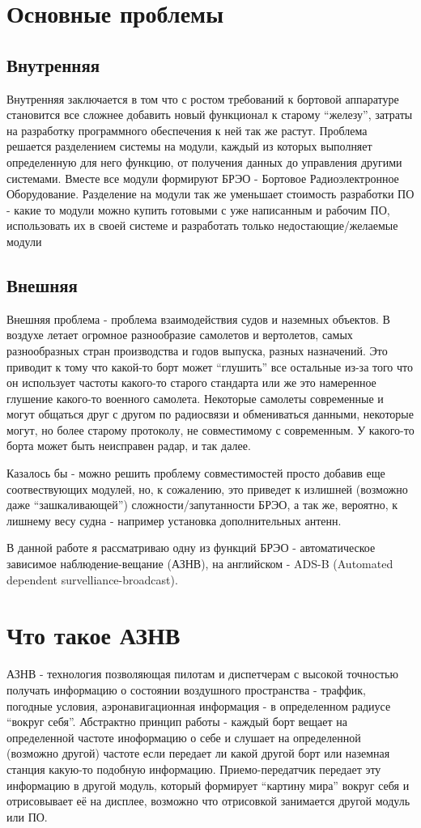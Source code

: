 \documentclass[a4paper,12pt]{report} %
\begin{document}
\section{Основные проблемы}

\subsection{Внутренняя}
Внутренняя заключается в том что с ростом требований к бортовой аппаратуре
становится все сложнее добавить новый функционал к старому ``железу'', затраты
на разработку программного обеспечения к ней так же растут. Проблема решается
разделением системы на модули, каждый из которых выполняет определенную для него
функцию, от получения данных до управления другими системами. Вместе все модули
формируют БРЭО - Бортовое Радиоэлектронное Оборудование. Разделение на модули
так же уменьшает стоимость разработки ПО - какие то модули можно купить готовыми
с уже написанным и рабочим ПО, использовать их в своей системе и разработать
только недостающие/желаемые модули

\subsection{Внешняя}
Внешняя проблема - проблема взаимодействия судов и наземных объектов. В воздухе
летает огромное разнообразие самолетов и вертолетов, самых разнообразных стран
производства и годов выпуска, разных назначений. Это приводит к тому что
какой-то борт может ``глушить'' все остальные из-за того что он использует
частоты какого-то старого стандарта или же это намеренное глушение какого-то
военного самолета. Некоторые самолеты современные и могут общаться друг с другом
по радиосвязи и обмениваться данными, некоторые могут, но более старому
протоколу, не совместимому с современным. У какого-то борта может быть
неисправен радар, и так далее.

Казалось бы - можно решить проблему совместимостей просто добавив еще
соотвествующих модулей, но, к сожалению, это приведет к излишней (возможно даже
``зашкаливающей'') сложности/запутанности БРЭО, а так же, вероятно, к лишнему
весу судна - например установка дополнительных антенн.

В данной работе я рассматриваю одну из функций БРЭО - автоматическое зависимое
наблюдение-вещание (АЗНВ), на английском - ADS-B (Automated dependent
survelliance-broadcast). 

\section{Что такое АЗНВ}
АЗНВ - технология позволяющая пилотам и диспетчерам с высокой точностью получать
информацию о состоянии воздушного пространства - траффик, погодные условия,
аэронавигационная информация - в определенном радиусе ``вокруг себя''.
Абстрактно принцип работы - каждый борт вещает на определенной частоте иноформацию о себе и
слушает на определенной (возможно другой) частоте если передает ли какой другой
борт или наземная станция какую-то подобную информацию. Приемо-передатчик
передает эту информацию в другой модуль, который формирует ``картину мира''
вокруг себя и отрисовывает её на дисплее, возможно что отрисовкой занимается
другой модуль или ПО.
\end{document}
